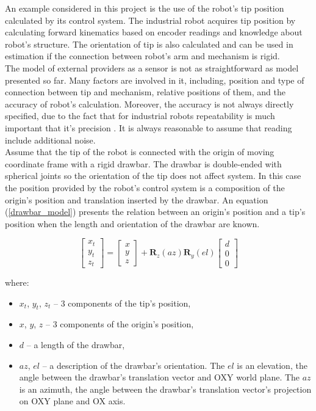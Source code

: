 An example considered in this project is the use of the robot's tip position calculated by its control system. The industrial robot acquires tip position by calculating forward kinematics based on encoder readings and knowledge about robot's structure. The orientation of tip is also calculated and can be used in estimation if the connection between robot's arm and mechanism is rigid.\\

The model of external providers as a sensor is not as straightforward as model presented so far. Many factors are involved in it, including, position and type of connection between tip and mechanism, relative positions of them, and the accuracy of robot's calculation. Moreover, the accuracy is not always directly specified, due to the fact that for industrial robots repeatability is much important that it's precision \cite{shiakolas2002accuracy}.
It is always reasonable to assume that reading include additional noise.\\

Assume that the tip of the robot is connected with the origin of moving coordinate frame with a rigid drawbar. The drawbar is double-ended with spherical joints so the orientation of the tip does not affect system. In this case the position provided by the robot's control system is a composition of the origin's position and translation inserted by the drawbar. An equation (\ref{drawbar_model}) presents the relation between an origin's position and a tip's position when the length and orientation of the drawbar are known.

\begin{equation}
	\begin{bmatrix}
		x_t \\ y_t \\ z_t 
	\end{bmatrix}
	=
	\begin{bmatrix}
		x \\ y \\ z 
	\end{bmatrix}
	+
	\bm{R}_z \left( az \right)
	\bm{R}_y \left( el \right)
	\begin{bmatrix}
		d \\ 0 \\ 0 
	\end{bmatrix}
	\label{drawbar_model}
\end{equation}

where:
\begin{itemize}
	\item $x_t$, $y_t$, $z_t$ -- 3 components of the tip's position,
	\item $x$, $y$, $z$ -- 3 components of the origin's position,
	\item $d$ -- a length of the drawbar,
	\item $az$, $el$ -- a description of the drawbar's orientation. The $el$ is an elevation, the angle between the drawbar's translation vector and OXY world plane. The $az$ is an azimuth, the angle between the drawbar's translation vector's projection on OXY plane and OX axis.
\end{itemize}




